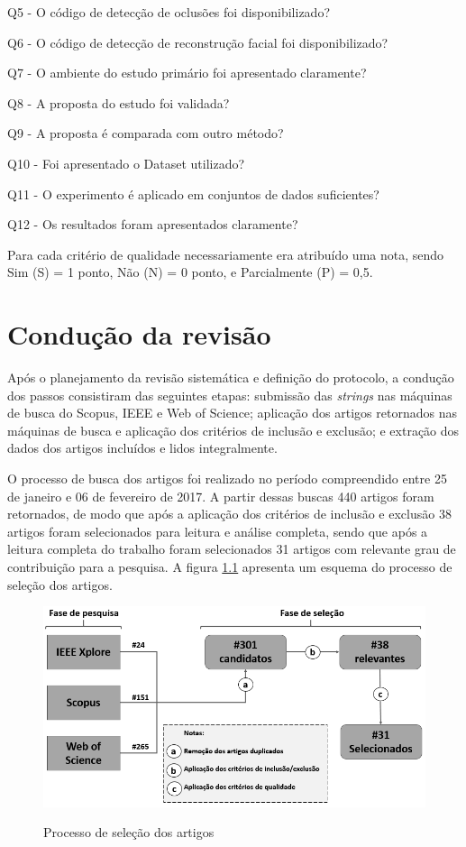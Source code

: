 Q5 -	O código de detecção de oclusões foi disponibilizado?

Q6 - 	O código de detecção de reconstrução facial foi disponibilizado?

Q7 -	O ambiente do estudo primário foi apresentado claramente?

Q8 -	A proposta do estudo foi validada?

Q9 -	A proposta é comparada com outro método?

Q10 -	 Foi apresentado o Dataset utilizado?

Q11 - 	 O experimento é aplicado em conjuntos de dados suficientes?

Q12 -	 Os resultados foram apresentados claramente?

Para cada critério de qualidade necessariamente era atribuído uma nota, sendo Sim (S) = 1 ponto, Não (N) = 0 ponto, e Parcialmente (P) = 0,5.



\chapter{Condução da revisão}
\label{apen3:conducao_Revisao}


Após o planejamento da revisão sistemática e definição do protocolo, a condução dos passos consistiram das seguintes etapas: submissão das \textit{strings} nas máquinas de busca do Scopus, IEEE e Web of Science; aplicação dos artigos retornados nas máquinas de busca e aplicação dos critérios de inclusão e exclusão; e extração dos dados dos artigos incluídos e lidos integralmente.

O processo de busca dos artigos foi realizado no período compreendido entre 25 de janeiro e 06 de fevereiro de 2017. A partir dessas buscas 440 artigos foram retornados, de modo que após a aplicação dos critérios de inclusão e exclusão 38 artigos foram selecionados para leitura e análise completa, sendo que após a leitura completa do trabalho foram selecionados 31 artigos com relevante grau de contribuição para a pesquisa. A figura \ref{fig:esquemaconducao} apresenta um esquema do processo de seleção dos artigos.

\begin{figure}[H]
\caption{Processo de seleção dos artigos}
\centering
\includegraphics[scale = 0.65]{imgs/conducao.png}
\label{fig:esquemaconducao}
\end{figure}





